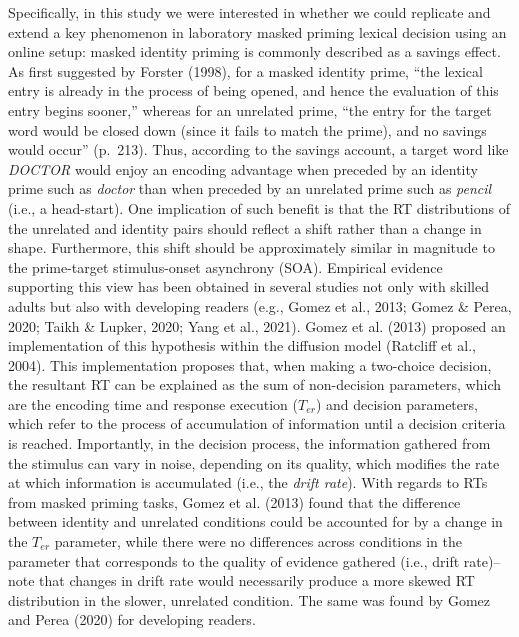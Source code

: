\documentclass[
  english,
  man,floatsintext]{apa6}
\begin{document}
Specifically, in this study we were interested in whether we could replicate and extend a key phenomenon in laboratory masked priming lexical decision using an online setup: masked identity priming is commonly described as a savings effect. As first suggested by Forster (1998), for a masked identity prime, ``the lexical entry is already in the process of being opened, and hence the evaluation of this entry begins sooner,'' whereas for an unrelated prime, ``the entry for the target word would be closed down (since it fails to match the prime), and no savings would occur'' (p.~213). Thus, according to the savings account, a target word like \emph{DOCTOR} would enjoy an encoding advantage when preceded by an identity prime such as \emph{doctor} than when preceded by an unrelated prime such as \emph{pencil} (i.e., a head-start). One implication of such benefit is that the RT distributions of the unrelated and identity pairs should reflect a shift rather than a change in shape. Furthermore, this shift should be approximately similar in magnitude to the prime-target stimulus-onset asynchrony (SOA). Empirical evidence supporting this view has been obtained in several studies not only with skilled adults but also with developing readers (e.g., Gomez et al., 2013; Gomez \& Perea, 2020; Taikh \& Lupker, 2020; Yang et al., 2021). Gomez et al. (2013) proposed an implementation of this hypothesis within the diffusion model (Ratcliff et al., 2004). This implementation proposes that, when making a two-choice decision, the resultant RT can be explained as the sum of non-decision parameters, which are the encoding time and response execution (\(T_{er}\)) and decision parameters, which refer to the process of accumulation of information until a decision criteria is reached. Importantly, in the decision process, the information gathered from the stimulus can vary in noise, depending on its quality, which modifies the rate at which information is accumulated (i.e., the \emph{drift rate}). With regards to RTs from masked priming tasks, Gomez et al. (2013) found that the difference between identity and unrelated conditions could be accounted for by a change in the \(T_{er}\) parameter, while there were no differences across conditions in the parameter that corresponds to the quality of evidence gathered (i.e., drift rate)--note that changes in drift rate would necessarily produce a more skewed RT distribution in the slower, unrelated condition. The same was found by Gomez and Perea (2020) for developing readers.
\end{document}
